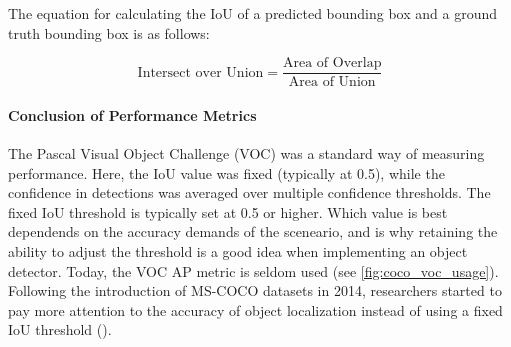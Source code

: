 The equation for calculating the IoU of a predicted bounding box and a ground truth bounding box is as follows:

\begin{equation}
    \text{Intersect over Union} = \frac{\text{Area of Overlap}}{\text{Area of Union}}
\end{equation}

\paragraph{Conclusion of Performance Metrics}
The Pascal Visual Object Challenge (VOC) was a standard way of measuring performance. Here, the IoU value was fixed (typically at 0.5), while the confidence in detections was averaged over multiple confidence thresholds. The fixed IoU threshold is typically set at 0.5 or higher. Which value is best dependends on the accuracy demands of the sceneario, and is why retaining the ability to adjust the threshold is a good idea when implementing an object detector. Today, the VOC AP metric is seldom used (see \ref{fig:coco_voc_usage}). Following the introduction of MS-COCO datasets in 2014, researchers started to pay more attention to the accuracy of object localization instead of using a fixed IoU threshold (\cite{zou2023object_detection_in_20_years}).


